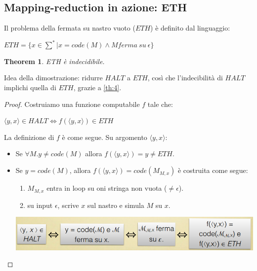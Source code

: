 \documentclass[a4paper, 12pt]{article}
\newtheorem{theorem}{Theorem}[section]
\begin{document}
\subsection{Mapping-reduction in azione: ETH}
Il problema della fermata su nastro vuoto ($ETH$) \`e definito dal linguaggio:
\begin{center}
$ETH = \{x \in \sum^* | x = code(M) \land M ferma\ su\ \epsilon\}$
\end{center}
\begin{theorem}
\label{th:5}
ETH \`e indecidibile.
\end{theorem}
Idea della dimostrazione: ridurre $HALT$ a $ETH$, cos\`i che l'indecibilit\`a di $HALT$ implichi quella di $ETH$, grazie a \ref{th:4}.
\begin{proof}
Costruiamo una funzione computabile $f$ tale che:
\begin{center}
$\langle y,x \rangle \in HALT \iff f(\langle y,x \rangle) \in ETH$
\end{center}
La definizione di $f$ \`e come segue. Su argomento $\langle y,x \rangle$:
\begin{itemize}
\item Se $\forall M.y \neq code(M)$ allora $f(\langle y,x \rangle) = y \neq ETH$.
\item Se $y=code(M)$, allora $f(\langle y,x \rangle) = code(M_{M,x})$ \`e costruita come segue:
\begin{enumerate}
\item $M_{M,x}$ entra in loop su oni stringa non vuota ($\neq \epsilon$).
\item su input $\epsilon$, scrive $x$ sul nastro e simula $M$ su $x$.\\
\end{enumerate}
\includegraphics[scale=0.4]{ETH1.png}
\end{itemize}
\end{proof}
\end{document}
